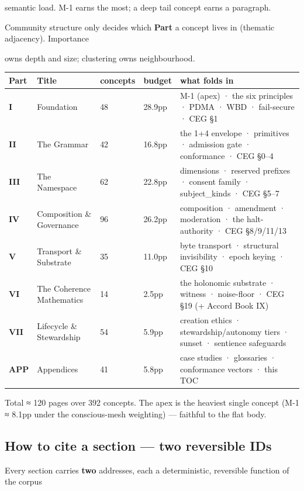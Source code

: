 \documentclass[11pt]{article}
\begin{document}
  semantic load. M-1 earns the most; a deep tail concept earns a paragraph.


Community structure only decides which \textbf{Part} a concept lives in (thematic adjacency). Importance

owns depth and size; clustering owns neighbourhood.


{\scriptsize
\begin{longtable}{|p{3.2cm}|p{3.2cm}|p{3.2cm}|p{3.2cm}|p{3.2cm}|}\hline
\textbf{Part} & \textbf{Title} & \textbf{concepts} & \textbf{budget} & \textbf{what folds in} \\ \hline\endhead
\textbf{I} & Foundation & 48 & 28.9pp & M-1 (apex) · the six principles · PDMA · WBD · fail-secure · CEG §1 \\ \hline
\textbf{II} & The Grammar & 42 & 16.8pp & the 1+4 envelope · primitives · admission gate · conformance · CEG §0–4 \\ \hline
\textbf{III} & The Namespace & 62 & 22.8pp & dimensions · reserved prefixes · consent family · subject\_kinds · CEG §5–7 \\ \hline
\textbf{IV} & Composition \& Governance & 96 & 26.2pp & composition · amendment · moderation · the halt-authority · CEG §8/9/11/13 \\ \hline
\textbf{V} & Transport \& Substrate & 35 & 11.0pp & byte transport · structural invisibility · epoch keying · CEG §10 \\ \hline
\textbf{VI} & The Coherence Mathematics & 14 & 2.5pp & the holonomic substrate · witness · noise-floor · CEG §19 (+ Accord Book IX) \\ \hline
\textbf{VII} & Lifecycle \& Stewardship & 54 & 5.9pp & creation ethics · stewardship/autonomy tiers · sunset · sentience safeguards \\ \hline
\textbf{APP} & Appendices & 41 & 5.8pp & case studies · glossaries · conformance vectors · this TOC \\ \hline
\end{longtable}}


Total ≈ 120 pages over 392 concepts. The apex is the heaviest single concept (M-1 ≈ 8.1pp under the conscious-mesh weighting) — faithful to the flat body.


\subsection*{How to cite a section — two reversible IDs}


Every section carries \textbf{two} addresses, each a deterministic, reversible function of the corpus
\end{document}
